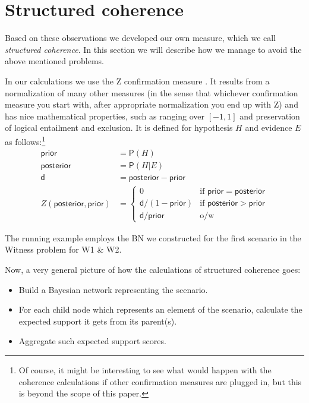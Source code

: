 \documentclass[10pt,]{scrartcl}
\newcommand{\pr}{\mathsf{P}}
\newcommand{\s}[1]{\mbox{\textsf{#1}}}
\begin{document}
\section{Structured coherence}\label{sec:structured}


Based on these observations we developed our own measure, which we call
\textit{structured coherence}. In this section we will describe how we
manage to avoid the above mentioned problems.  


In our calculations we use the \s{Z} confirmation measure \citep[see][for a detailed study and defense]{crupi2007BayesianMeasuresEvidential}. It results from a
normalization of many other measures (in the sense that whichever
confirmation measure you start with, after appropriate normalization you
end up with \s{Z}) and has nice mathematical properties, such as ranging
over \([-1,1]\) and preservation of logical entailment and exclusion. It
is defined for hypothesis \(H\) and evidence \(E\) as follows:\footnote{Of course, it might be interesting to see what would happen
with the coherence calculations if other confirmation measures are
plugged in, but this is beyond the scope of this paper.}
\begin{align*}
   \mathsf{prior} & = \pr(H) \\
   \mathsf{posterior} & = \pr(H \vert E)\\
   \mathsf{d} & = \mathsf{posterior} - \mathsf{prior} \\
       Z(\mathsf{posterior,prior}) & =  \begin{cases}
       0 & \text{if } \mathsf{prior} = \mathsf{posterior}\\
       \mathsf{d}/(1-\mathsf{prior}) & \text{if } \mathsf{posterior} > \mathsf{prior} \\
         \mathsf{d}/\mathsf{prior} & \text{o/w} 
       \end{cases}
   \end{align*}



 The running example employs the BN we
constructed for the first scenario in the \textsf{Witness} problem for \textsf{W1} \& \textsf{W2}.











Now, a very general picture of how the calculations of structured coherence  goes:

\begin{itemize}
    \item Build a Bayesian network representing the scenario.
    \item For each child node which represents an element of the scenario, calculate the expected support it gets from its parent(s). 
    \item Aggregate such expected support scores.
\end{itemize}
\end{document}
